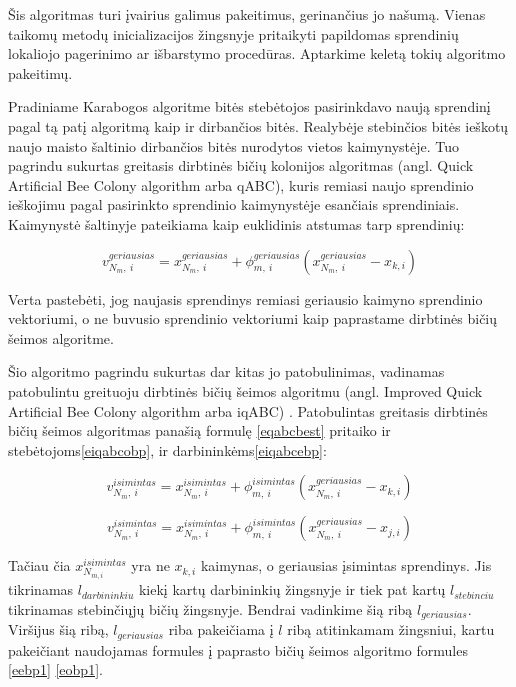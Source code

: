 \documentclass{VUMIFPSmagistrinis}
\begin{document}
Šis algoritmas turi įvairius galimus pakeitimus, gerinančius jo našumą. Vienas taikomų metodų inicializacijos žingsnyje pritaikyti papildomas sprendinių lokaliojo pagerinimo ar išbarstymo procedūras. Aptarkime keletą tokių algoritmo pakeitimų.



Pradiniame Karabogos algoritme \cite{KaB07}  bitės stebėtojos pasirinkdavo naują sprendinį pagal tą patį algoritmą kaip ir dirbančios bitės. Realybėje stebinčios bitės ieškotų naujo maisto šaltinio dirbančios bitės nurodytos vietos kaimynystėje. Tuo pagrindu sukurtas greitasis dirbtinės bičių kolonijos algoritmas \cite{KaG14} (angl. Quick Artificial Bee Colony algorithm arba qABC), kuris remiasi naujo sprendinio ieškojimu pagal pasirinkto sprendinio kaimynystėje esančiais sprendiniais. Kaimynystė šaltinyje pateikiama kaip euklidinis atstumas tarp sprendinių: 

\begin{equation}
\label{eqabcbest}
v_{N_m,\ i}^{geriausias}=x_{N_m,\ i}^{geriausias}+\phi_{m,\ i}^{geriausias}(x_{N_m,\ i}^{geriausias}-x_{k,i} )
\end{equation}

Verta pastebėti, jog naujasis sprendinys remiasi geriausio kaimyno sprendinio vektoriumi, o ne buvusio sprendinio vektoriumi kaip paprastame dirbtinės bičių šeimos algoritme.


Šio algoritmo pagrindu sukurtas dar kitas jo patobulinimas, vadinamas patobulintu greituoju dirbtinės bičių šeimos algoritmu (angl. Improved Quick Artificial Bee Colony algorithm arba iqABC) \cite{ABK19}.
Patobulintas greitasis dirbtinės bičių šeimos algoritmas panašią formulę \eqref{eqabcbest} pritaiko ir stebėtojoms\eqref{eiqabcobp}, ir darbininkėms\eqref{eiqabcebp}:

\begin{equation}\label{eiqabcobp}
v_{N_m,\ i}^{isimintas}=x_{N_m,\ i}^{isimintas}+\phi_{m,\ i}^{isimintas}(x_{N_m,\ i}^{geriausias}-x_{k,i} )
\end{equation}

\begin{equation}\label{eiqabcebp}
v_{N_m,\ i}^{isimintas}=x_{N_m,\ i}^{isimintas}+\phi_{m,\ i}^{isimintas}(x_{N_m,\ i}^{geriausias}-x_{j,i} )
\end{equation}


Tačiau čia $x_{N_{m,i}}^{isimintas}$ yra ne $x_{k,i}$  kaimynas, o geriausias įsimintas sprendinys. Jis tikrinamas $l_{darbininkiu}$ kiekį kartų darbininkių žingsnyje ir tiek pat kartų $l_{stebinciu}$ tikrinamas stebinčiųjų bičių žingsnyje. Bendrai vadinkime šią ribą $l_{geriausias}$. Viršijus šią ribą, $l_{geriausias}$ riba pakeičiama į $l$ ribą atitinkamam žingsniui, kartu pakeičiant naudojamas formules į paprasto bičių šeimos algoritmo formules \eqref{eebp1} \eqref{eobp1}. 
\end{document}
